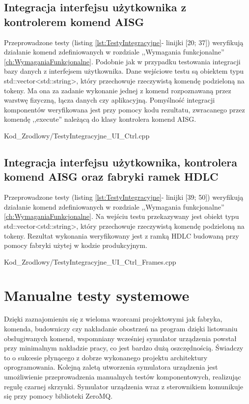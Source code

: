     \subsection{Integracja interfejsu użytkownika z kontrolerem komend AISG}
    Przeprowadzone testy (listing \ref{lst:TestyIntegracyjne}- linijki [20; 37]) weryfikują działanie komend zdefiniowanych w rozdziale ,,Wymagania funkcjonalne''
    \ref{ch:WymaganiaFunkcjonalne}.
    Podobnie jak w przypadku testowania integracji bazy danych z interfejsem użytkownika. Dane wejściowe testu są obiektem typu std::vector<std::string>, który przechowuje
    rzeczywistą komendę podzieloną na tokeny. Ma ona za zadanie wykonanie jednej z komend rozpoznawaną przez warstwę fizyczną, łącza danych czy aplikacyjną.
    Pomyślność integracji komponentów weryfikowana jest przy pomocy kodu rezultatu, zwracanego przez komendę ,,execute'' należącą do klasy kontrolera komend AISG.
    
        {Kod_Zrodlowy/TestyIntegracyjne_UI_Ctrl.cpp}
\newpage

    \subsection{Integracja interfejsu użytkownika, kontrolera komend AISG oraz fabryki ramek HDLC}
    Przeprowadzone testy (listing \ref{lst:TestyIntegracyjne}- linijki [39; 50]) weryfikują działanie komend zdefiniowanych w rozdziale ,,Wymagania funkcjonalne''
    \ref{ch:WymaganiaFunkcjonalne}.
    Na wejściu testu przekazywany jest obiekt typu std::vector<std::string>, który przechowuje rzeczywistą komendę podzieloną na tokeny. Rezultat wykonania
    weryfikowany jest z ramką HDLC budowaną przy pomocy fabryki użytej w kodzie produkcyjnym.
    
        {Kod_Zrodlowy/TestyIntegracyjne_UI_Ctrl_Frames.cpp}
\section{Manualne testy systemowe}
Dzięki zaznajomieniu się z wieloma wzorcami projektowymi jak fabryka, komenda, 
budowniczy czy nakładanie obostrzeń na program dzięki listowaniu obsługiwanych komend, wspomniany wcześniej symulator urządzenia powstał
przy minimalnym nakładzie pracy, co jest bardzo dużą oszczędnością. Świadczy to o sukcesie płynącego z 
dobrze wykonanego projektu architektury oprogramowania. Kolejną zaletą utworzenia symulatora urządzenia jest umożliwienie przeprowadzenia manualnych testów komponentowych, 
realizując regułę czarnej skrzynki. Symulator urządzenia wraz z sterownikiem komunikuje się przy pomocy biblioteki ZeroMQ.

